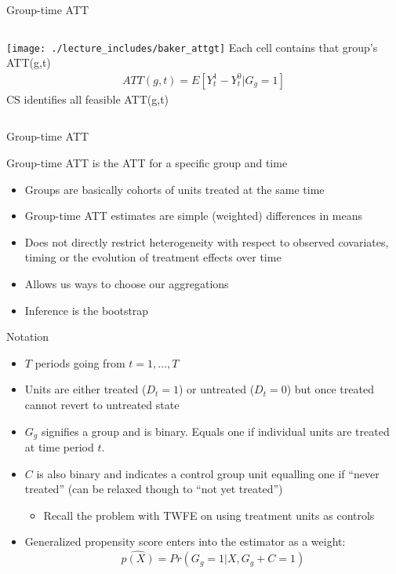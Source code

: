 \documentclass{beamer}
\begin{document}
\begin{frame}{Group-time ATT}
       \begin{columns}
             \centering
             \texttt{[image: ./lecture\_includes/baker\_attgt]}
            Each cell contains that group's ATT(g,t)
\begin{eqnarray*}
ATT(g,t) = E[Y_t^1 - Y_t^0 | G_g=1]
\end{eqnarray*}CS identifies all feasible ATT(g,t)
         \end{columns} 
    \end{frame}




\begin{frame}{Group-time ATT}

Group-time ATT is the ATT for a specific group and time
\begin{itemize}
\item Groups are basically cohorts of units treated at the same time
\item Group-time ATT estimates are simple (weighted) differences in means
\item Does not directly restrict heterogeneity with respect to observed covariates, timing or the evolution of treatment effects over time
\item Allows us ways to choose our aggregations
\item Inference is the bootstrap
\end{itemize}

\end{frame}



\begin{frame}{Notation}

\begin{itemize}
\item $T$ periods going from $t=1, \dots, T$
\item Units are either treated ($D_t=1$) or untreated ($D_t=0$) but once treated cannot revert to untreated state
\item $G_g$ signifies a group and is binary.  Equals one if individual units are treated at time period $t$.
\item $C$ is also binary and indicates a control group unit equalling one if ``never treated'' (can be relaxed though to ``not yet treated'')
	\begin{itemize}
	\item Recall the problem with TWFE on using treatment units as controls
	\end{itemize}
\item Generalized propensity score enters into the estimator as a weight: $$\widehat{p(X)} = Pr(G_g=1 | X,G_g+C=1)$$
\end{itemize}

\end{frame}
\end{document}
